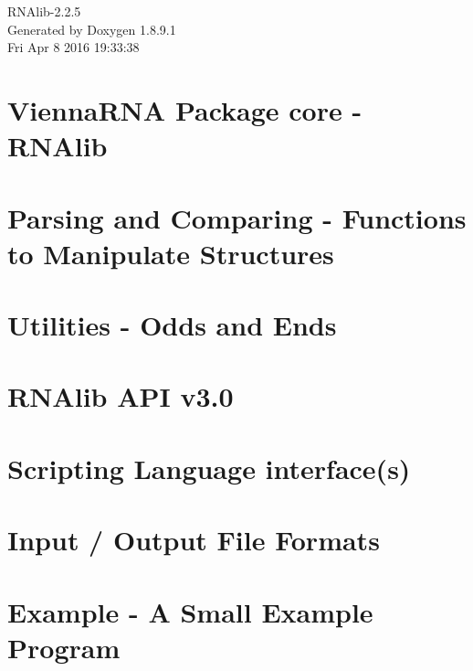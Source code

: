 \documentclass[twoside]{book}
\newcommand{\+}{\discretionary{\mbox{\scriptsize$\hookleftarrow$}}{}{}}
\newcommand{\clearemptydoublepage}{%
  \newpage{\pagestyle{empty}\cleardoublepage}%
}
\begin{document}
\hypersetup{pageanchor=false,
             bookmarks=true,
             bookmarksnumbered=true,
             pdfencoding=unicode
            }
\begin{titlepage}
\vspace*{7cm}
\begin{center}%
{\Large R\+N\+Alib-\/2.2.5 }\\
\vspace*{1cm}
{\large Generated by Doxygen 1.8.9.1}\\
\vspace*{0.5cm}
{\small Fri Apr 8 2016 19:33:38}\\
\end{center}
\end{titlepage}
\clearemptydoublepage
\tableofcontents
\clearemptydoublepage
{}
\hypersetup{pageanchor=true}

\chapter{Vienna\+R\+N\+A Package core -\/ R\+N\+Alib}
\label{index}\hypertarget{index}{}
\chapter{Parsing and Comparing -\/ Functions to Manipulate Structures}
\label{mp_parse}
\hypertarget{mp_parse}{}

\chapter{Utilities -\/ Odds and Ends}
\label{mp_utils}
\hypertarget{mp_utils}{}

\chapter{R\+N\+Alib A\+P\+I v3.0}
\label{newAPI}
\hypertarget{newAPI}{}

\chapter{Scripting Language interface(s)}
\label{swig_interface}
\hypertarget{swig_interface}{}

\chapter{Input / Output File Formats}
\label{file_formats}
\hypertarget{file_formats}{}

\chapter{Example -\/ A Small Example Program}
\label{mp_example}
\hypertarget{mp_example}{}

\end{document}
